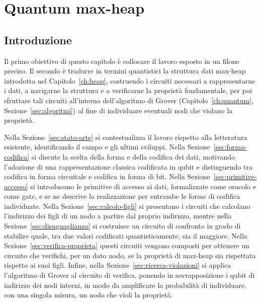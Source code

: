 \chapter{Quantum max-heap}
\section{Introduzione}
Il primo obiettivo di questo capitolo è collocare il lavoro esposto in un filone preciso. Il secondo è tradurre in termini quantistici la struttura dati max-heap introdotta nel Capitolo~\ref{ch:heap}, costruendo i circuiti necessari a rappresentarne i dati, a navigarne la struttura e a verificarne la proprietà fondamentale, per poi sfruttare tali circuiti all'interno dell'algoritmo di Grover (Capitolo~\ref{ch:quantum}, Sezione~\ref{sec:algoritmi}) al fine di individuare eventuali nodi che violano la proprietà.

Nella Sezione~\ref{sec:stato-arte} si contestualizza il lavoro rispetto alla letteratura esistente, identificando il campo e gli ultimi sviluppi. Nella Sezione~\ref{sec:forma-codifica} si discute la scelta della forma e della codifica dei dati, motivando l'adozione di una rappresentazione classica codificata in qubit e distinguendo tra codifica in forma circuitale e codifica in forma di bit. Nella Sezione~\ref{sec:primitive-accesso} si introducono le primitive di accesso ai dati, formalizzate come oracolo e come gate, e se ne descrive la realizzazione per entrambe le forme di codifica individuate. Nella Sezione~\ref{sec:calcolo-figli} si presentano i circuiti che calcolano l'indirizzo dei figli di un nodo a partire dal proprio indirizzo, mentre nella Sezione~\ref{sec:disuguaglianza} si costruisce un circuito di confronto in grado di stabilire quale, tra due valori codificati quantisticamente, sia il maggiore. Nella Sezione~\ref{sec:verifica-proprieta} questi circuiti vengono composti per ottenere un circuito che verifichi, per un dato nodo, se la proprietà di max-heap sia rispettata rispetto ai suoi figli. Infine, nella Sezione~\ref{sec:ricerca-violazioni} si applica l'algoritmo di Grover al circuito di verifica, ponendo in sovrapposizione i qubit di indirizzo dei nodi interni, in modo da amplificare la probabilità di individuare, con una singola misura, un nodo che violi la proprietà.

